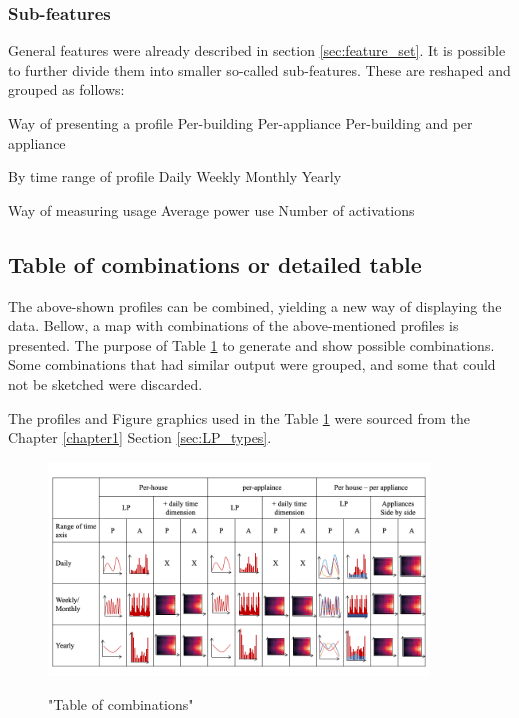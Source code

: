 \subsubsection{Sub-features} \label{sec:subfeatures}

General features were already described in section \ref{sec:feature_set}.
It is possible to further divide them into smaller so-called sub-features.
These are reshaped and grouped as follows:
\begin{outline}

\1 Way of presenting a profile
\2 Per-building 
\2 Per-appliance 
\2 Per-building and per appliance

\1 By time range of profile 
\2 Daily
\2 Weekly
\2 Monthly
\2 Yearly

\1 Way of measuring usage
\2 Average power use 
\2 Number of activations
\end{outline}


\subsection{Table of combinations or detailed table}

The above-shown profiles can be combined, yielding a new way of displaying the data.
Bellow, a map with combinations of the above-mentioned profiles is presented. 
The purpose of Table \ref{fig:map_fig} to generate and show possible combinations.
Some combinations that had similar output were grouped, and some that could not be sketched were discarded. 

The profiles and Figure graphics used in the Table \ref{fig:map_fig} were sourced from the Chapter \ref{chapter1} Section \ref{sec:LP_types}.

\begin{figure}[H]
	\centering
	\caption{"Table of combinations"}
	\includegraphics[width=0.9\textwidth]{Figures/profile_sketches/Slide14.png}
	\label{fig:map_fig}
\end{figure}

